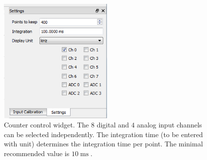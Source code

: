 \documentclass[11pt]{scrartcl}
\newcommand{\unit}[1]{\ensuremath{\operatorname{#1}}}
\begin{document}
\begin{figure}
\centering
\includegraphics[width=0.5\textwidth]{DedicatedCountersSettings}
\caption{\label{DedicatedCountersSettings} Counter control widget. The $8$ digital and $4$ analog input channels can be selected independently. The integration time (to be entered with unit) determines the integration time per point. The minimal recommended value is $10\unit{ms}$. }
\end{figure}
\end{document}
